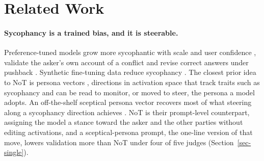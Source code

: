 \section{Related Work}
\label{sec-related}

\paragraph{Sycophancy is a trained bias, and it is steerable.}
Preference-tuned models grow more sycophantic with scale and user confidence
\citep{perez2023discovering,sharma23}, validate the asker's own account of a
conflict \citep{cheng25elephant} and revise correct answers under pushback
\citep{fanous2025syceval,malmqvist24}. Synthetic fine-tuning data reduce
sycophancy \citep{wei2023synthetic}. The closest prior idea to NoT is
persona vectors \citep{chen2025persona}, directions in activation space that
track traits such as sycophancy and can be read to monitor, or
moved to steer, the persona a model adopts. An off-the-shelf sceptical
persona vector recovers most of what steering along a sycophancy direction
\citep{rimsky2024caa} achieves \citep{kelkar2026devil}. NoT is their
prompt-level counterpart, assigning the model a stance toward the asker and
the other parties without editing activations, and a sceptical-persona
prompt, the one-line version of that move, lowers validation more than NoT
under four of five judges (Section~\ref{sec-single}).
